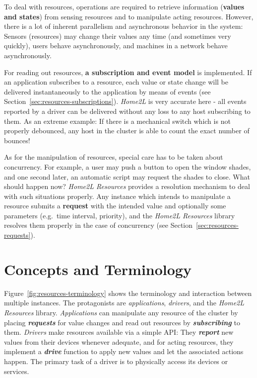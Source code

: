 \documentclass[12pt,english,parskip=half,headheight=19pt]{scrreprt}
\begin{document}
To deal with resources, operations are required to retrieve information
(\textbf{values and states}) from sensing resources and to manipulate acting
resources. However, there is a lot of inherent parallelism and asynchronous
behavior in the system: Sensors (resources) may change their values any
time (and sometimes very quickly), users behave asynchronously, and
machines in a network behave asynchronously.

For reading out resources, \textbf{a subscription and event model} is implemented.
If an application subscribes to a resource, each value or state
change will be delivered instantaneously to the application by means of
events (see Section~\ref{sec:resources-subscriptions}).
\textit{Home2L} is very accurate here - all events reported by a driver can be delivered without
any loss to any host subscribing to them. As an extreme example: If there is a
mechanical switch which is not properly debounced, any host in the
cluster is able to count the exact number of bounces!

As for the manipulation of resources, special care has to be taken about
concurrency. For example, a user may push a button to open the window
shades, and one second later, an automatic script may request the
shades to close. What should happen now?
\textit{Home2L Resources} provides
a resolution mechanism to deal with such situations properly. Any
instance which intends to manipulate a resource submits a \textbf{request}
with the intended value and optionally some parameters (e.g.~time interval,
priority), and the \textit{Home2L Resources} library resolves them
properly in the case of concurrency (see Section~\ref{sec:resources-requests}).





\section{Concepts and Terminology}
\label{sec:resources-terminology}


Figure~\ref{fig:resources-terminology} shows the terminology and interaction between multiple instances. The protagonists are \textit{applications}, \textit{drivers}, and the \textit{Home2L Resources} library.
\textit{Applications} can manipulate any resource of the cluster by placing \textbf{\textit{requests}} for value changes and read out resources by \textbf{\textit{subscribing}} to them. \textit{Drivers} make resources available via a simple API: They \textbf{\textit{report}} new values from their devices whenever adequate, and for acting resources, they implement a \textbf{\textit{drive}} function to apply new values and let the associated actions happen. The primary task of a driver is to physically access its devices or services.
\end{document}
